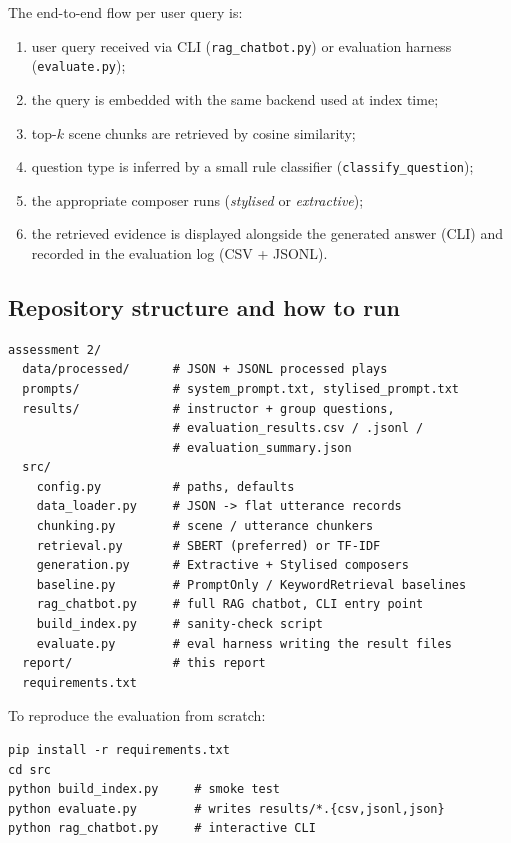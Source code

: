 \documentclass[10pt,conference]{IEEEtran}
\begin{document}
The end-to-end flow per user query is:

\begin{enumerate}
    \item user query received via CLI (\verb|rag_chatbot.py|) or
        evaluation harness (\verb|evaluate.py|);
    \item the query is embedded with the same backend used at
        index time;
    \item top-$k$ scene chunks are retrieved by cosine similarity;
    \item question type is inferred by a small rule classifier
        (\verb|classify_question|);
    \item the appropriate composer runs
        (\emph{stylised} or \emph{extractive});
    \item the retrieved evidence is displayed alongside the generated
        answer (CLI) and recorded in the evaluation log (CSV + JSONL).
\end{enumerate}

\subsection{Repository structure and how to run}

\begin{lstlisting}[basicstyle=\ttfamily\scriptsize,frame=none,xleftmargin=0pt]
assessment 2/
  data/processed/      # JSON + JSONL processed plays
  prompts/             # system_prompt.txt, stylised_prompt.txt
  results/             # instructor + group questions,
                       # evaluation_results.csv / .jsonl /
                       # evaluation_summary.json
  src/
    config.py          # paths, defaults
    data_loader.py     # JSON -> flat utterance records
    chunking.py        # scene / utterance chunkers
    retrieval.py       # SBERT (preferred) or TF-IDF
    generation.py      # Extractive + Stylised composers
    baseline.py        # PromptOnly / KeywordRetrieval baselines
    rag_chatbot.py     # full RAG chatbot, CLI entry point
    build_index.py     # sanity-check script
    evaluate.py        # eval harness writing the result files
  report/              # this report
  requirements.txt
\end{lstlisting}

To reproduce the evaluation from scratch:

\begin{lstlisting}[basicstyle=\ttfamily\scriptsize,frame=none,xleftmargin=0pt]
pip install -r requirements.txt
cd src
python build_index.py     # smoke test
python evaluate.py        # writes results/*.{csv,jsonl,json}
python rag_chatbot.py     # interactive CLI
\end{lstlisting}
\end{document}
